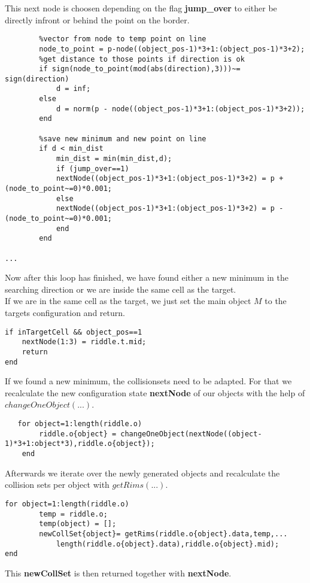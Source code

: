 This next node is choosen depending on the flag \textbf{jump\_over} to either be directly infront or behind the point on the border.
\begin{lstlisting}
        %vector from node to temp point on line
        node_to_point = p-node((object_pos-1)*3+1:(object_pos-1)*3+2);
        %get distance to those points if direction is ok
        if sign(node_to_point(mod(abs(direction),3)))~= sign(direction)
            d = inf;
        else
            d = norm(p - node((object_pos-1)*3+1:(object_pos-1)*3+2));
        end
        
        %save new minimum and new point on line
        if d < min_dist
            min_dist = min(min_dist,d);
            if (jump_over==1)
            nextNode((object_pos-1)*3+1:(object_pos-1)*3+2) = p + (node_to_point~=0)*0.001;
            else
            nextNode((object_pos-1)*3+1:(object_pos-1)*3+2) = p - (node_to_point~=0)*0.001;
            end
        end
        
...
\end{lstlisting}
Now after this loop has finished, we have found either a new minimum in the searching direction or we are inside the same cell as the target. \\
If we are in the same cell as the target, we just set the main object $M$ to the targets configuration and return.
\begin{lstlisting}
if inTargetCell && object_pos==1
    nextNode(1:3) = riddle.t.mid;
    return
end
\end{lstlisting}
If we found a new minimum, the collisionsets need to be adapted. For that we recalculate the new configuration state \textbf{nextNode} of our objects with the help of $changeOneObject(...)$.
\begin{lstlisting}
   for object=1:length(riddle.o)
        riddle.o{object} = changeOneObject(nextNode((object-1)*3+1:object*3),riddle.o{object});    
    end
\end{lstlisting}
Afterwards we iterate over the newly generated objects and recalculate the collision sets per object with $getRims(...)$.
\begin{lstlisting}
for object=1:length(riddle.o)
        temp = riddle.o;
        temp(object) = [];
        newCollSet{object}= getRims(riddle.o{object}.data,temp,...
            length(riddle.o{object}.data),riddle.o{object}.mid);
end
\end{lstlisting}
This \textbf{newCollSet} is then returned together with \textbf{nextNode}.

